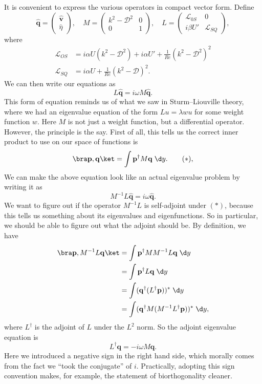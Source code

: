 \documentclass[a4paper]{article}
\begin{document}
It is convenient to express the various operators in compact vector form. Define
\[
  \hat{\mathbf{q}} =
  \begin{pmatrix}
    \hat{\mathbf{v}}\\\hat{\eta}
  \end{pmatrix},\quad
  M =
  \begin{pmatrix}
    k^2 - \mathcal{D}^2 & 0\\
    0 & 1
  \end{pmatrix},\quad
  L =
  \begin{pmatrix}
    \mathcal{L}_{0S} & 0\\
    i \beta U' & \mathcal{L}_{SQ}
  \end{pmatrix},
\]
where
\begin{align*}
  \mathcal{L}_{OS} &= i\alpha U(k^2 - \mathcal{D}^2) + i \alpha U' + \frac{1}{Re} (k^2 - \mathcal{D}^2)^2\\
  \mathcal{L}_{SQ} &= i\alpha U + \frac{1}{Re}(k^2 - \mathcal{D})^2.
\end{align*}
We can then write our equations as
\[
  L\hat{\mathbf{q}} = i \omega M \hat{\mathbf{q}}.
\]
This form of equation reminds us of what we saw in Sturm--Liouville theory, where we had an eigenvalue equation of the form $Lu = \lambda w u$ for some weight function $w$. Here $M$ is not just a weight function, but a differential operator. However, the principle is the say. First of all, this tells us the correct inner product to use on our space of functions is
\[
  \bra \mathbf{p}, \mathbf{q}\ket = \int \mathbf{p}^\dagger M \mathbf{q} \;\d y.\tag{$*$},
\]
We can make the above equation look like an actual eigenvalue problem by writing it as
\[
  M^{-1}L \hat{\mathbf{q}} = i \omega \hat{\mathbf{q}}.
\]
We want to figure out if the operator $M^{-1}L$ is self-adjoint under $(*)$, because this tells us something about its eigenvalues and eigenfunctions. So in particular, we should be able to figure out what the adjoint should be. By definition, we have
\begin{align*}
  \bra \mathbf{p}, M^{-1}L\mathbf{q}\ket &= \int \mathbf{p}^\dagger MM^{-1} L \mathbf{q}\;\d y\\
  &= \int \mathbf{p}^\dagger L\mathbf{q}\;\d y\\
  &= \int (\mathbf{q}^\dagger (L^\dagger \mathbf{p}))^*\;\d y\\
  &= \int (\mathbf{q}^\dagger M (M^{-1} L^\dagger \mathbf{p}))^*\;\d y,
\end{align*}
where $L^\dagger$ is the adjoint of $L$ under the $L^2$ norm. So the adjoint eigenvalue equation is
\[
  L^\dagger \mathbf{q} = -i\omega M \mathbf{q}.
\]
Here we introduced a negative sign in the right hand side, which morally comes from the fact we ``took the conjugate'' of $i$. Practically, adopting this sign convention makes, for example, the statement of biorthogonality cleaner.
\end{document}
